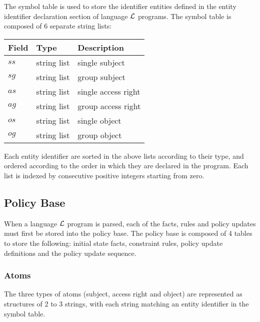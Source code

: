 \documentclass[11pt, twocolumn]{article}
\newenvironment{vquote}
  {\begin{list}{}{\leftmargin 1em}\item[]}
  {\end{list}}
\begin{document}
      The symbol table is used to store the identifier entities defined in
      the entity identifier declaration section of language ${\cal L}$
      programs. The symbol table is composed of 6 separate string lists:

      \begin{vquote}
        \begin{tabular}[t]{|l|l|l|}
          \hline
          \textbf{Field} & \textbf{Type} & \textbf{Description} \\
          \hline
          $ss$ & string list & single subject \\
          \hline
          $sg$ & string list & group subject \\
          \hline
          $as$ & string list & single access right \\
          \hline
          $ag$ & string list & group access right \\
          \hline
          $os$ & string list & single object \\
          \hline
          $og$ & string list & group object \\
          \hline
        \end{tabular}
      \end{vquote}

      Each entity identifier are sorted in the above lists according to
      their type, and ordered according to the order in which they are
      declared in the program. Each list is indexed by consecutive
      positive integers starting from zero.

    \subsection{Policy Base}

      When a language ${\cal L}$ program is parsed, each of the facts,
      rules and policy updates must first be stored into the policy base.
      The policy base is composed of 4 tables to store the following:
      initial state facts, constraint rules, policy update definitions and
      the policy update sequence.

      \subsubsection{Atoms}

        The three types of atoms (subject, access right and object) are
        represented as structures of 2 to 3 strings, with each string
        matching an entity identifier in the symbol table.
\end{document}
